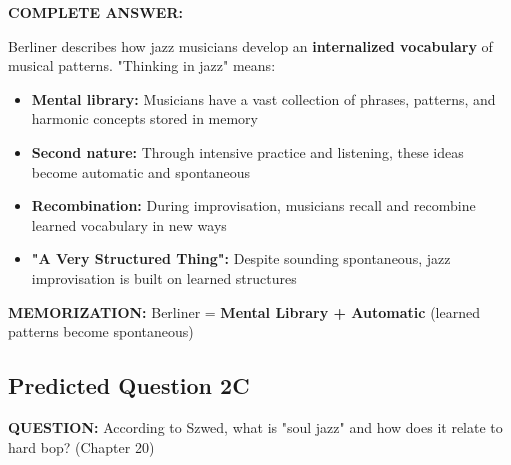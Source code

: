 \documentclass[11pt]{article}
\begin{document}
\begin{mdframed}[backgroundcolor=answercolor!10, linewidth=2pt]
\textbf{\textcolor{answercolor}{COMPLETE ANSWER:}}

Berliner describes how jazz musicians develop an \textbf{internalized vocabulary} of musical patterns. "Thinking in jazz" means:

\begin{itemize}[leftmargin=*, nosep]
    \item \textbf{Mental library:} Musicians have a vast collection of phrases, patterns, and harmonic concepts stored in memory
    \item \textbf{Second nature:} Through intensive practice and listening, these ideas become automatic and spontaneous
    \item \textbf{Recombination:} During improvisation, musicians recall and recombine learned vocabulary in new ways
    \item \textbf{"A Very Structured Thing":} Despite sounding spontaneous, jazz improvisation is built on learned structures
\end{itemize}

\vspace{5pt}
\end{mdframed}

\textbf{MEMORIZATION:} Berliner = \textbf{Mental Library + Automatic} (learned patterns become spontaneous)

\subsection*{Predicted Question 2C}

\begin{mdframed}[backgroundcolor=questioncolor!10, linewidth=2pt]
\textbf{\textcolor{questioncolor}{QUESTION:}} According to Szwed, what is "soul jazz" and how does it relate to hard bop? (Chapter 20)
\end{mdframed}
\end{document}
